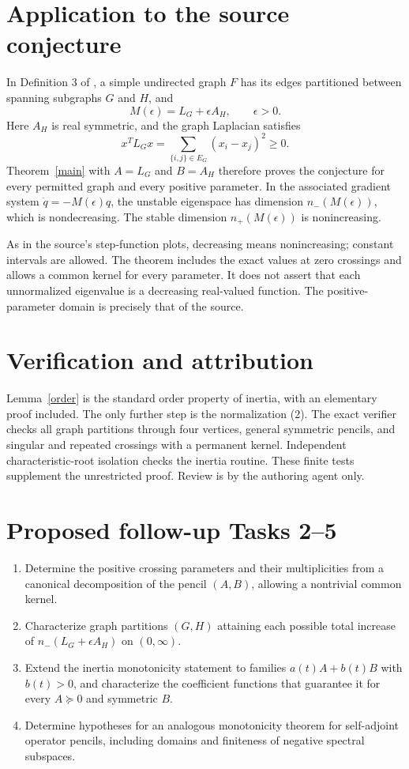 \documentclass[11pt]{article}
\begin{document}
\section*{Application to the source conjecture}
In Definition 3 of \cite{source}, a simple undirected graph $F$ has
its edges partitioned between spanning subgraphs $G$ and $H$, and
\[
 M(\epsilon)=L_G+\epsilon A_H,\qquad \epsilon>0.
\]
Here $A_H$ is real symmetric, and the graph Laplacian satisfies
\[
 x^TL_Gx=\sum_{\{i,j\}\in E_G}(x_i-x_j)^2\ge0.
\]
Theorem~\ref{main} with $A=L_G$ and $B=A_H$ therefore proves the
conjecture for every permitted graph and every positive parameter.
In the associated gradient system $\dot q=-M(\epsilon)q$, the unstable
eigenspace has dimension $n_-(M(\epsilon))$, which is nondecreasing.
The stable dimension $n_+(M(\epsilon))$ is nonincreasing.

As in the source's step-function plots, decreasing means nonincreasing;
constant intervals are allowed. The theorem includes the exact values at
zero crossings and allows a common kernel for every parameter. It does
not assert that each unnormalized eigenvalue is a decreasing real-valued
function. The positive-parameter domain is precisely that of the source.

\section*{Verification and attribution}
Lemma~\ref{order} is the standard order property of inertia, with an
elementary proof included. The only further step is the normalization (2).
The exact verifier checks all graph partitions through four vertices,
general symmetric pencils, and singular and repeated crossings with a
permanent kernel. Independent characteristic-root isolation checks the
inertia routine. These finite tests supplement the unrestricted proof.
Review is by the authoring agent only.

\section*{Proposed follow-up Tasks 2--5}
\begin{enumerate}[label=\textbf{Task \arabic*.},start=2,leftmargin=*]
\item Determine the positive crossing parameters and their multiplicities
from a canonical decomposition of the pencil $(A,B)$, allowing a
nontrivial common kernel.
\item Characterize graph partitions $(G,H)$ attaining each possible total
increase of $n_-(L_G+\epsilon A_H)$ on $(0,\infty)$.
\item Extend the inertia monotonicity statement to families
$a(t)A+b(t)B$ with $b(t)>0$, and characterize the coefficient functions
that guarantee it for every $A\succeq0$ and symmetric $B$.
\item Determine hypotheses for an analogous monotonicity theorem for
self-adjoint operator pencils, including domains and finiteness of
negative spectral subspaces.
\end{enumerate}
\end{document}
